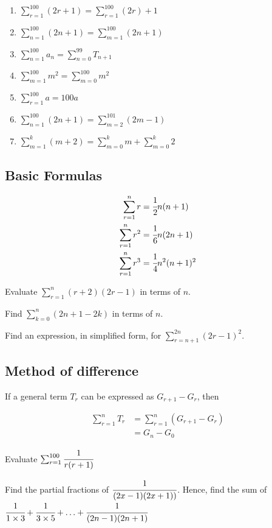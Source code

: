 \documentclass[letterpaper]{article}
\begin{document}
\begin{enumerate}
\item $\sum_{r=1}^{100} (2r + 1) = \sum_{r=1}^{100} (2r) + 1$
\item $\sum_{n=1}^{100} (2n + 1) = \sum_{m=1}^{100} (2n + 1)$
\item $\sum_{n=1}^{100} a_n = \sum_{n=0}^{99} T_{n+1}$
\item $\sum_{m=1}^{100} m^2 = \sum_{m=0}^{100} m^2$
\item $\sum_{r=1}^{100} a = 100a$
\item $\sum_{n=1}^{100} (2n + 1) = \sum_{m=2}^{101} (2m - 1)$
\item $\sum_{m=1}^k (m + 2) = \sum_{m = 0}^k m + \sum_{m=0}^k 2$
\end{enumerate}

\subsection{Basic Formulas}

\begin{align*}
\sum_{r=1}^n r &= \cfrac{1}{2} n (n + 1) \\
\sum_{r=1}^n r^2 &= \cfrac{1}{6} n (2n + 1) \\
\sum_{r=1}^n r^3 &= \cfrac{1}{4} n^2 (n+1)^2
\end{align*}

Evaluate $\sum_{r=1}^n (r+2)(2r - 1)$ in terms of $n$.

Find $\sum_{k=0}^n (2n + 1 - 2k)$ in terms of $n$.

Find an expression, in simplified form, for $\sum_{r = n+1}^{2n} (2r - 1)^2$.

\subsection{Method of difference}

If a general term $T_r$ can be expressed as $G_{r+1} - G_r$, then

\begin{align*}
\sum_{r=1}^n T_r &= \sum_{r=1}^n (G_{r+1} - G_r) \\
&= G_n - G_0
\end{align*}

Evaluate $\sum_{r=1}^{100} \cfrac{1}{r(r+1)}$

Find the partial fractions of $\cfrac{1}{(2x - 1)(2x + 1))}$. Hence, find the sum of $\cfrac{1}{1 \times 3} + \cfrac{1}{3 \times 5} + \ldots + \cfrac{1}{(2n - 1)(2n + 1)}$
\end{document}
